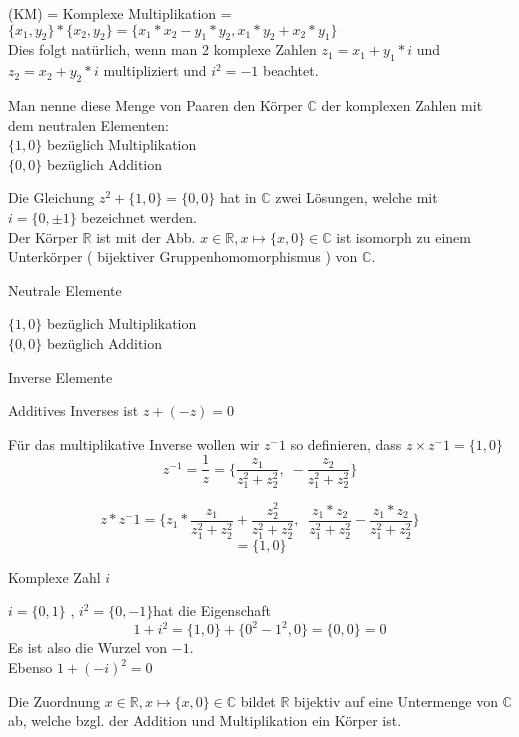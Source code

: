 \documentclass[smallheadings,headsepline,12pt,a4paper]{scrartcl}
\begin{document}
(KM) = Komplexe Multiplikation = $\{x_1,y_2\} * \{x_2,y_2\} = \{x_1 * x_2 - y_1*y_2 , x_1 *y_2 + x_2 * y_1\} $ \\ 
Dies folgt natürlich, wenn man 2 komplexe Zahlen $z_1 = x_1 + y_1 * i $ und $z_2 = x_2 + y_2 * i  $ multipliziert und $i^2= -1$ beachtet. \\

\item Man nenne diese Menge von Paaren den Körper $\mathbb{C}$ der komplexen Zahlen mit dem neutralen Elementen: \\
$\{1,0\}$ bezüglich Multiplikation\\
$\{0,0\}$ bezüglich Addition \\

\item Die Gleichung $ z^2 + \{1,0\} = \{0,0\} $ hat in $\mathbb{C}$ zwei Lösungen, welche mit \\
$i=\{0,\pm 1\} $ bezeichnet werden. \\
Der Körper $\mathbb{R}$ ist mit der Abb. $x \in \mathbb{R}, x \mapsto \{x,0\} \in \mathbb{C} $ ist isomorph 
zu einem Unterkörper ( bijektiver Gruppenhomomorphismus ) von $\mathbb{C}$. \\

\begin{center}
\item[Neutrale Elemente]
\end{center}
\item 
$\{1,0\}$ bezüglich Multiplikation\\
$\{0,0\}$ bezüglich Addition \\

\begin{center}
\item[Inverse Elemente]
\end{center}
\item Additives Inverses ist $ z + (-z) = 0$ \\
\item Für das multiplikative Inverse wollen wir $z^-1 $ so definieren, dass $z \times z^-1 = \{1,0\} $ \\

$$ z^{-1} = \frac{1}{z} = \{\frac{z_1}{z^2_1 + z^2_2} , \;  - \frac{z_2}{z^2_1 + z^2_2}\} $$

$$ z * z^-1 = \{z_1 * \frac{z_1}{z^2_1+z^2_2} + \frac{z^2_2}{z^2_1+z^2_2}, \; \; \frac{z_1*z_2}{z^2_1+z^2_2} - \frac{z_1*z_2}{z^2_1+z^2_2}\} 
$$ 
$$ = \{1,0\} $$

\begin{center}
\item[Komplexe Zahl $i$]
\end{center}
\item $ i = \{0,1\} $ , $ i^2 = \{0,-1\} $hat die Eigenschaft \\
$$ 1+i^2 = \{1,0\} + \{0^2-1^2,0 \} = \{0,0\} = 0 $$ Es ist also die Wurzel von $-1$. \\
Ebenso $ 1+(-i)^2 = 0 $\\
\item Die Zuordnung  $x \in \mathbb{R}, x \mapsto \{x,0\} \in \mathbb{C} $ bildet $\mathbb{R}$ bijektiv auf eine Untermenge von $\mathbb{C}$ ab, welche bzgl. der Addition und Multiplikation ein Körper ist.
\end{document}
